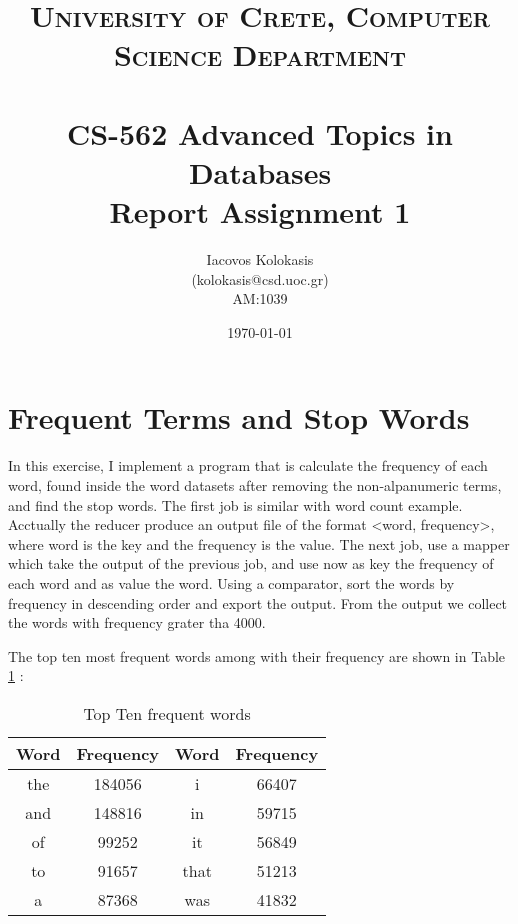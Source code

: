 \documentclass[paper=a4, fontsize=11pt]{scrartcl} %
\title{	
\normalfont \normalsize 
\textsc{University of Crete, Computer Science Department} \\ [25pt] %
\horrule{0.5pt} \\[0.4cm] %
\huge CS-562 Advanced Topics in Databases \\ 
Report Assignment 1 %
\horrule{2pt} \\[0.5cm] %
}
\author{Iacovos Kolokasis \\(kolokasis@csd.uoc.gr) \\AM:1039} %
\date{\normalsize\today} %
\numberwithin{equation}{section} %
\numberwithin{figure}{section} %
\numberwithin{table}{section} %
\begin{document}
\maketitle %


\section{Frequent Terms and Stop Words}
In this exercise, I implement a program that is calculate the frequency of each
word, found inside the word datasets after removing the non-alpanumeric terms, and
find the stop words. The first job is similar with word count example. Acctually
the reducer produce an output file of the format <word, frequency>, where word
is the key and the frequency is the value. The next job, use a mapper which take
the output of the previous job, and use now as key the frequency of each word
and as value the word. Using a comparator, sort the words by frequency in
descending order and export the output. From the output we collect the words
with frequency grater tha 4000.

The top ten most frequent words among with their frequency are shown in Table
\ref{tab:words:freq}  :

\begin{table}
    \center
    \begin{tabular}{ |c|c||c|c|}
    \hline
        Word &Frequency &Word &Frequency\\
        \hline
        the     &184056	&i       &66407	\\ 
        \hline          
        and     &148816	&in      &59715	\\ 
        \hline          
        of      &99252	&it      &56849	\\ 
        \hline          
        to      &91657	&that    &51213	\\ 
        \hline          
        a       &87368	&was     &41832	\\ 
        \hline
    \end{tabular}
    \caption {Top Ten frequent words}
    \label{tab:words:freq}
\end{table}
\FloatBarrier
\end{document}
